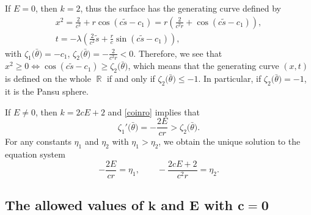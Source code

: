 \documentclass[10pt,a4paper]{amsart}
\numberwithin{equation}{section}
\DeclareMathOperator{\R}{\mathbb R}
\begin{document}
If $E=0$, then $k=2$, thus the surface has the generating curve defined by
\begin{gather*}
x^{2}=\frac{2}{c^2}+r\cos{(c\tilde{s}-c_1)}=r\left(\frac{2}{c^{2}r}+\cos{(c\tilde{s}-c_1)}\right),\\
t=-\lambda\left(\frac{2}{c^2}\tilde{s}+\frac{r}{c}\sin{(c\tilde{s}-c_1)}\right),
\end{gather*}
with
$\zeta_{1}\bigl(\bar \theta\bigr)=-c_{1}$, $ \zeta_{2}\bigl(\bar \theta\bigr)=-\frac{2}{c^{2}r}<0$.
Therefore, we see that
$x^{2}\geq 0\Leftrightarrow \cos{(c\tilde{s}-c_1)}\geq\zeta_{2}\bigl(\bar \theta\bigr)$,
which means that the generating curve $(x,t)$ is defined on the whole $\R$ if and only if $\zeta_{2}\bigl(\bar \theta\bigr)\leq-1$.
In particular, if $\zeta_{2}\bigl(\bar \theta\bigr)=-1$, it is the Pansu sphere.

If $E\neq 0$, then $k=2cE+2$ and
 \eqref{coinro} implies that
\begin{equation} \label{coinro1}
\zeta_{1}'\bigl(\bar \theta\bigr)=-\frac{2E}{cr}>\zeta_{2}\bigl(\bar \theta\bigr).
\end{equation}
For any constants $\eta_{1}$ and $\eta_{2}$ with $\eta_{1}>\eta_{2}$, we
obtain the unique solution to the equation system
\[
-\frac{2E}{c r}=\eta_{1},\qquad -\frac{2cE+2}{c^{2}r}=\eta_{2}.
\]

\subsection[The allowed values of k and E with c=0]{The allowed values of $\boldsymbol{ k}$ and $\boldsymbol{E}$ with $\boldsymbol{c=0}$}
\end{document}
